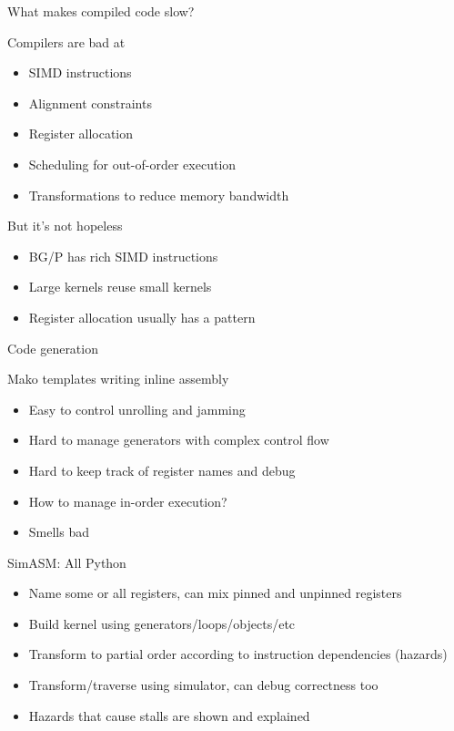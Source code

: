 \begin{frame}{What makes compiled code slow?}
  \begin{block}{Compilers are bad at}
    \begin{itemize}
    \item SIMD instructions
    \item Alignment constraints
    \item Register allocation
    \item Scheduling for out-of-order execution
    \item Transformations to reduce memory bandwidth
    \end{itemize}
  \end{block}
  \begin{block}{But it's not hopeless}
    \begin{itemize}
    \item BG/P has rich SIMD instructions
    \item Large kernels reuse small kernels
    \item Register allocation usually has a pattern
    \end{itemize}
  \end{block}
\end{frame}

\begin{frame}{Code generation}
  \begin{block}{Mako templates writing inline assembly}
    \begin{itemize}
    \item Easy to control unrolling and jamming
    \item Hard to manage generators with complex control flow
    \item Hard to keep track of register names and debug
    \item How to manage in-order execution?
    \item Smells bad
    \end{itemize}
  \end{block}
  \begin{block}{SimASM: All Python}
    \begin{itemize}
    \item Name some or all registers, can mix pinned and unpinned registers
    \item Build kernel using generators/loops/objects/etc
    \item Transform to partial order according to instruction dependencies (hazards)
    \item Transform/traverse using simulator, can debug correctness too
    \item Hazards that cause stalls are shown and explained
    \end{itemize}
  \end{block}
\end{frame}

